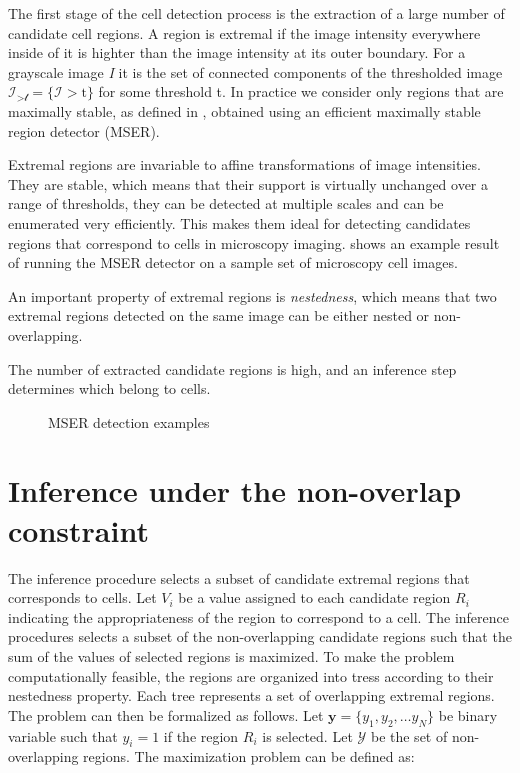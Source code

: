 	The first stage of the cell detection process is the extraction of a large number of candidate cell regions. A region is extremal  if the image intensity everywhere inside of it is highter than the image intensity at its outer boundary. For a grayscale image \textit{I} it is the set of connected components of the thresholded image $\mathcal{I_{>\text{t}}} = \{\mathcal{I} > \text{t}\}$ for some threshold t. In practice we consider only regions that are maximally stable, as defined in \cite{matas04}, obtained using an efficient maximally stable region detector (MSER).
	
	Extremal regions are invariable to affine transformations of image intensities. They are stable, which means that their support is virtually unchanged over a range of thresholds, they can be detected at multiple scales and can be enumerated very efficiently. This makes them ideal for detecting candidates regions that correspond to cells in microscopy imaging.  shows an example result of running the MSER detector on a sample set of microscopy cell images.
	
	An important property of extremal regions is \textit{nestedness}, which means that two extremal regions detected on the same image can be either nested or non-overlapping.
	
	The number of extracted candidate regions is high, and an inference step determines which belong to cells.
	
	\begin{figure}[h]
		\centering
		\caption{MSER detection examples}
		\label{fig:mserexamplesoncells}
	\end{figure}
	
	\section{Inference under the non-overlap constraint \statusfirstdraft}
	\label{sec:detector_inference}
	
	The inference procedure selects a subset of candidate extremal regions that corresponds to cells. Let $V_i$ be a value assigned to each candidate region $R_i$ indicating the appropriateness of the region to correspond to a cell. The inference procedures selects a subset of the non-overlapping candidate regions such that the sum of the values of selected regions is maximized. To make the problem computationally feasible, the regions are organized into tress according to their nestedness property. Each tree represents a set of overlapping extremal regions. The problem can then be formalized as follows. Let $\textbf{y} = \{y_1, y_2, \dots y_N\}$ be binary variable such that $y_i = 1$ if the region $R_i$ is selected. Let $\mathcal{Y}$ be the set of non-overlapping regions. The maximization problem can be defined as:
	
